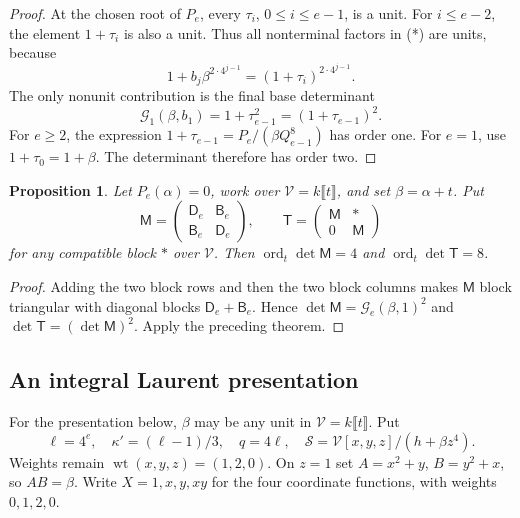 \documentclass[11pt,a4paper,reqno]{amsart}
\numberwithin{equation}{section}
\theoremstyle{plain}
\newtheorem{proposition}[theorem]{Proposition}
\theoremstyle{definition}
\theoremstyle{remark}
\DeclareMathOperator{\ord}{ord}
\DeclareMathOperator{\wt}{wt}
\begin{document}
\begin{proof}
At the chosen root of $P_e$, every $\tau_i$, $0\leq i\leq e-1$, is a unit.
For $i\leq e-2$, the element $1+\tau_i$ is also a unit. Thus all
nonterminal factors in (*) are units, because
\[
1+b_j\beta^{2\cdot4^{j-1}}=(1+\tau_i)^{2\cdot4^{j-1}}.
\]
The only nonunit contribution is the final base determinant
\[
\mathcal G_1(\beta,b_1)=1+\tau_{e-1}^2=(1+\tau_{e-1})^2.
\]
For $e\geq2$, the expression
$1+\tau_{e-1}=P_e/(\beta Q_{e-1}^8)$ has order one.
For $e=1$, use $1+\tau_0=1+\beta$. The determinant therefore has order two.
\end{proof}

\begin{proposition}
Let $P_e(\alpha)=0$, work over $\mathcal V=k\llbracket t\rrbracket$,
and set $\beta=\alpha+t$. Put
\[
\mathsf M=\begin{pmatrix}\mathsf D_e&\mathsf B_e\\ \mathsf B_e&\mathsf D_e\end{pmatrix},\qquad
\mathsf T=\begin{pmatrix}\mathsf M&\ast\\0&\mathsf M\end{pmatrix}
\]
for any compatible block $\ast$ over $\mathcal V$. Then
$\ord_t\det \mathsf M=4$ and $\ord_t\det \mathsf T=8$.
\end{proposition}
\begin{proof}
Adding the two block rows and then the two block columns makes
$\mathsf M$ block triangular with diagonal blocks
$\mathsf D_e+\mathsf B_e$. Hence
$\det\mathsf M=\mathcal G_e(\beta,1)^2$ and
$\det\mathsf T=(\det\mathsf M)^2$. Apply the preceding theorem.
\end{proof}

\subsection{An integral Laurent presentation}
For the presentation below, $\beta$ may be any unit in
$\mathcal V=k\llbracket t\rrbracket$. Put
\[
\ell=4^e,
\quad \kappa'=(\ell-1)/3,\quad q=4\ell,\quad
\mathcal S=\mathcal V[x,y,z]/(h+\beta z^4).
\]
Weights remain $\wt(x,y,z)=(1,2,0)$. On $z=1$ set $A=x^2+y$, $B=y^2+x$, so $AB=\beta$. Write $X=1,x,y,xy$ for the four coordinate functions, with weights $0,1,2,0$.
\end{document}
